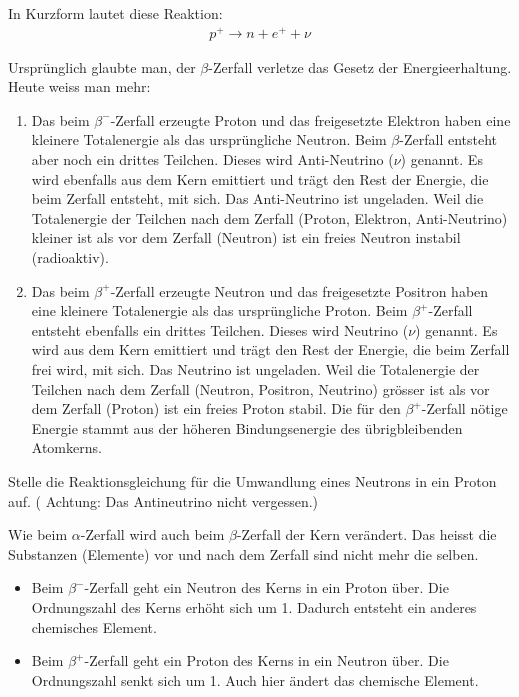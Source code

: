 \documentclass[12pt,a4paper,twoside]{article}
\begin{document}
In Kurzform lautet diese Reaktion:\\
\begin{eqnarray*}
	p^+ \to n + e^+ + \nu
\end{eqnarray*}


Ursprünglich glaubte man, der $\beta$-Zerfall verletze das Gesetz der Energieerhaltung. Heute weiss man mehr:

\begin{enumerate}
\item Das beim $\beta^-$-Zerfall erzeugte Proton und das freigesetzte Elektron haben eine
	kleinere Totalenergie als das ursprüngliche Neutron. Beim $\beta$-Zerfall entsteht aber noch ein drittes Teilchen.
	Dieses wird Anti-Neutrino ($\nu$) genannt. Es wird ebenfalls aus dem Kern emittiert und trägt den Rest der Energie,
	die beim Zerfall entsteht, mit sich. Das Anti-Neutrino ist ungeladen. Weil die Totalenergie der Teilchen nach dem
	Zerfall (Proton, Elektron, Anti-Neutrino) kleiner ist als vor dem Zerfall (Neutron) ist ein freies Neutron instabil (radioaktiv).

\item Das beim $\beta^+$-Zerfall erzeugte Neutron und das freigesetzte Positron haben eine kleinere Totalenergie
	als das ursprüngliche Proton. Beim $\beta^+$-Zerfall entsteht ebenfalls ein drittes Teilchen. Dieses wird Neutrino
	($\nu$) genannt. Es wird aus dem Kern emittiert und trägt den Rest der Energie, die beim Zerfall frei wird, mit sich.
	Das Neutrino ist ungeladen. Weil die Totalenergie der Teilchen nach dem Zerfall (Neutron, Positron, Neutrino) grösser
	ist als vor dem Zerfall (Proton) ist ein freies Proton stabil. Die für den $\beta^+$-Zerfall nötige Energie stammt
	aus der höheren Bindungsenergie des übrigbleibenden Atomkerns.
\end{enumerate}

\begin{aufgabe}
Stelle die Reaktionsgleichung für die Umwandlung eines Neutrons in ein Proton auf. ( Achtung: Das Antineutrino nicht vergessen.)
\end{aufgabe}



Wie beim $\alpha$-Zerfall wird auch beim $\beta$-Zerfall der Kern verändert.
Das heisst die Substanzen (Elemente) vor und nach dem Zerfall sind nicht mehr die selben.

\begin{itemize}
	\item Beim $\beta^-$-Zerfall geht ein Neutron des Kerns in ein Proton über.
		Die Ordnungszahl des Kerns erhöht sich um 1. Dadurch entsteht ein anderes chemisches Element.

	\item Beim $\beta^+$-Zerfall geht ein Proton des Kerns in ein Neutron über.
		Die Ordnungszahl senkt sich um 1. Auch hier ändert das chemische Element.
\end{itemize}
\end{document}
